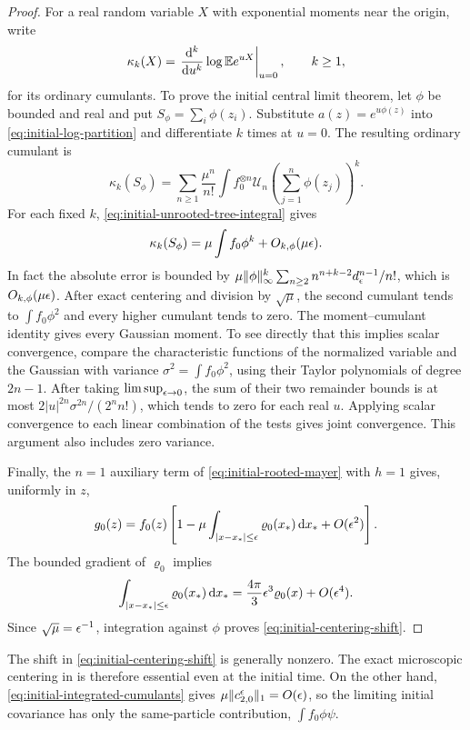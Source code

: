\begin{proof}
For a real random variable $X$ with exponential moments near the
origin, write
\[
 \kappa_k(X)=\left.\frac{\mathrm d^k}{\mathrm d u^k}\log\mathbb E e^{uX}\right|_{u=0},
 \qquad k\ge1,
\]
for its ordinary cumulants.
To prove the initial central limit theorem, let $\phi$ be bounded and
real and put $S_\phi=\sum_i\phi(z_i)$.  Substitute
$a(z)=e^{u\phi(z)}$ into \eqref{eq:initial-log-partition} and
differentiate $k$ times at $u=0$.  The resulting ordinary cumulant is
\[
 \kappa_k(S_\phi)=
 \sum_{n\ge1}\frac{\mu^n}{n!}
  \int f_0^{\otimes n}\mathcal U_n
        \left(\sum_{j=1}^n\phi(z_j)\right)^k.
\]
For each fixed $k$, \eqref{eq:initial-unrooted-tree-integral} gives
\begin{equation}\label{eq:initial-ordinary-cumulants}
 \kappa_k(S_\phi)=\mu\int f_0\phi^k+O_{k,\phi}(\mu\epsilon).
\end{equation}
In fact the absolute error is bounded by
$\mu\|\phi\|_\infty^k\sum_{n\ge2}
n^{n+k-2}d_\epsilon^{n-1}/n!$, which is $O_{k,\phi}(\mu\epsilon)$.
After exact centering and division by $\sqrt\mu$, the second cumulant
tends to $\int f_0\phi^2$ and every higher cumulant tends to zero.
The moment--cumulant identity gives every Gaussian moment.  To see
directly that this implies scalar convergence, compare the
characteristic functions of the normalized variable and the Gaussian
with variance \(\sigma^2=\int f_0\phi^2\), using their Taylor
polynomials of degree \(2n-1\).  After taking \(\limsup_{\epsilon\to0}\),
the sum of their two remainder bounds is at most
\(2|u|^{2n}\sigma^{2n}/(2^n n!)\), which tends to zero for each
real \(u\).  Applying scalar convergence to each linear combination
of the tests gives joint convergence.  This argument also includes
zero variance.

Finally, the $n=1$ auxiliary term of
\eqref{eq:initial-rooted-mayer} with $h=1$ gives, uniformly in $z$,
\[
 g_0(z)=f_0(z)\left[
  1-\mu\int_{|x-x_*|\le\epsilon}\varrho_0(x_*)\,\mathrm d x_*
  +O(\epsilon^2)\right].
\]
The bounded gradient of $\varrho_0$ implies
\[
 \int_{|x-x_*|\le\epsilon}\varrho_0(x_*)\,\mathrm d x_*
 =\frac{4\pi}{3}\epsilon^3\varrho_0(x)+O(\epsilon^4).
\]
Since $\sqrt\mu=\epsilon^{-1}$, integration against $\phi$ proves
\eqref{eq:initial-centering-shift}.
\end{proof}

\begin{remark}
The shift in \eqref{eq:initial-centering-shift} is generally nonzero.
The exact microscopic centering in  is therefore
essential even at the initial time.  On the other hand,
\eqref{eq:initial-integrated-cumulants} gives
$\mu\|c_{2,0}^{\epsilon}\|_1=O(\epsilon)$, so the limiting initial covariance
has only the same-particle contribution, $\int f_0\phi\psi$.
\end{remark}

